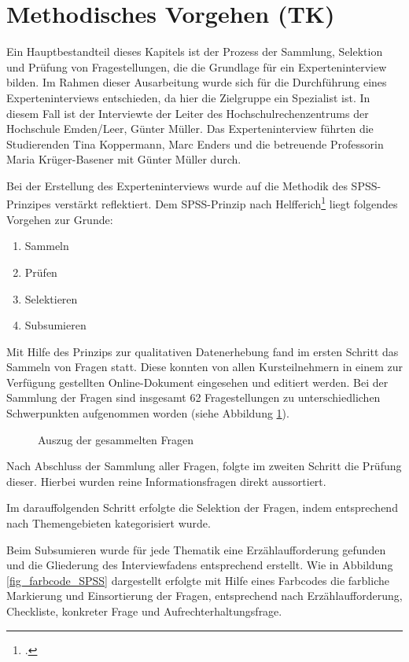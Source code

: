 \section{Methodisches Vorgehen (TK)}
Ein Hauptbestandteil dieses Kapitels ist der Prozess der Sammlung, Selektion und Prüfung von Fragestellungen, die die Grundlage für ein Experteninterview bilden. Im Rahmen dieser Ausarbeitung wurde sich für die Durchführung eines Experteninterviews entschieden, da hier die Zielgruppe ein Spezialist ist. In diesem Fall ist der Interviewte der Leiter des Hochschulrechenzentrums der Hochschule Emden/Leer, Günter Müller. Das Experteninterview führten die Studierenden Tina Koppermann, Marc Enders und die betreuende Professorin Maria Krüger-Basener mit Günter Müller durch. 

Bei der Erstellung des Experteninterviews wurde auf die Methodik des SPSS-Prinzipes verstärkt reflektiert. Dem SPSS-Prinzip nach Helfferich\footcite[Vgl.][182 ff.]{helfferich_2009} liegt folgendes Vorgehen zur Grunde:

\begin{enumerate}
	\item Sammeln
	\item Prüfen
	\item Selektieren
	\item Subsumieren		
\end{enumerate}

Mit Hilfe des Prinzips zur qualitativen Datenerhebung fand im ersten Schritt das Sammeln von Fragen statt. Diese konnten von allen Kursteilnehmern in einem zur Verfügung gestellten Online-Dokument eingesehen und editiert werden. Bei der Sammlung der Fragen sind insgesamt 62 Fragestellungen zu unterschiedlichen Schwerpunkten aufgenommen worden (siehe Abbildung \ref{fig_auszug_fragen_sammeln}).

\begin{figure}[h]
	\centering
	\caption{Auszug der gesammelten Fragen}
	\label{fig_auszug_fragen_sammeln}
\end{figure}
\clearpage

Nach Abschluss der Sammlung aller Fragen, folgte im zweiten Schritt die Prüfung dieser. Hierbei wurden reine Informationsfragen direkt aussortiert. 

Im darauffolgenden Schritt erfolgte die Selektion der Fragen, indem entsprechend nach Themengebieten kategorisiert wurde. 

Beim Subsumieren wurde für jede Thematik eine Erzählaufforderung gefunden und die Gliederung des Interviewfadens entsprechend erstellt. Wie in Abbildung \ref{fig_farbcode_SPSS} dargestellt erfolgte mit Hilfe eines Farbcodes die farbliche Markierung und Einsortierung der Fragen, entsprechend nach Erzählaufforderung, Checkliste, konkreter Frage und Aufrechterhaltungsfrage.

